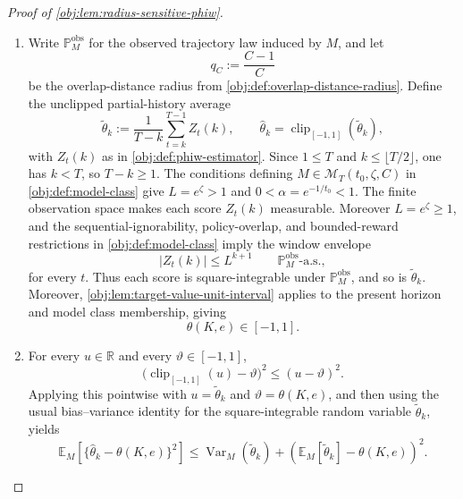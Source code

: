 \begin{proof}[Proof of \cref{obj:lem:radius-sensitive-phiw}]
\begin{enumerate}
\item
Write \(\mathbb P_M^{\mathrm{obs}}\) for the observed trajectory law induced by \(M\), and let
\[
q_C:=\frac{C-1}{C}
\]
be the overlap-distance radius from \cref{obj:def:overlap-distance-radius}.  Define the unclipped partial-history average
\[
\widetilde\theta_k
:=
\frac{1}{T-k}\sum_{t=k}^{T-1} Z_t(k),
\qquad
\widehat\theta_k
=
\operatorname{clip}_{[-1,1]}(\widetilde\theta_k),
\]
with \(Z_t(k)\) as in \cref{obj:def:phiw-estimator}.  Since \(1\le T\) and \(k\le \lfloor T/2\rfloor\), one has \(k<T\), so \(T-k\ge 1\).  The conditions defining \(M\in\mathcal M_T(t_0,\zeta,C)\) in \cref{obj:def:model-class} give \(L=e^\zeta>1\) and \(0<\alpha=e^{-1/t_0}<1\).  The finite observation space makes each score \(Z_t(k)\) measurable.  Moreover \(L=e^\zeta\ge 1\), and the sequential-ignorability, policy-overlap, and bounded-reward restrictions in \cref{obj:def:model-class} imply the window envelope
\[
|Z_t(k)|\le L^{k+1}
\qquad \mathbb P_M^{\mathrm{obs}}\text{-a.s.},
\]
for every \(t\).  Thus each score is square-integrable under \(\mathbb P_M^{\mathrm{obs}}\), and so is \(\widetilde\theta_k\).  Moreover, \cref{obj:lem:target-value-unit-interval} applies to the present horizon and model class membership, giving
\[
\theta(K,e)\in[-1,1].
\] %

\item
For every \(u\in\mathbb R\) and every \(\vartheta\in[-1,1]\),
\[
\bigl(\operatorname{clip}_{[-1,1]}(u)-\vartheta\bigr)^2
\le
(u-\vartheta)^2.
\]
Applying this pointwise with \(u=\widetilde\theta_k\) and \(\vartheta=\theta(K,e)\), and then using the usual bias--variance identity for the square-integrable random variable \(\widetilde\theta_k\), yields
\[
\mathbb E_M\!\left[
\{\widehat\theta_k-\theta(K,e)\}^2
\right]
\le
\operatorname{Var}_M(\widetilde\theta_k)
+
\left(
\mathbb E_M[\widetilde\theta_k]-\theta(K,e)
\right)^2 .
\] %


\end{enumerate}
\end{proof}
